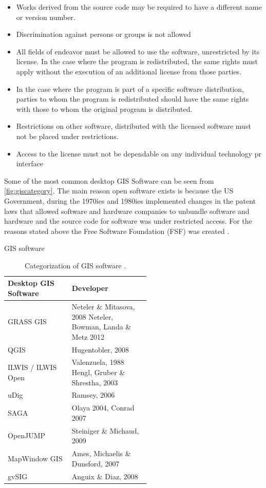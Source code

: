 \begin{itemize}
\item Works derived from the source code may be required to have a different name or version number.
\item Discrimination against persons or groups is not allowed
\item All fields of endeavor must be allowed to use the software, unrestricted by its license. In the case where the program is redistributed, the same rights must apply without the execution of an additional license from those parties.
\item In the case where the program is part of a specific software distribution, parties to whom the program is redistributed should have the same rights with those to  whom the original program is distributed.
\item Restrictions on other software, distributed with the licensed software must not be placed under restrictions.
\item Access to the license must not be dependable on any individual technology pr interface
\end{itemize}

Some of the most common desktop GIS Software can be seen from \autoref{fig:giscategory}.
The main reason open software exists is because the US Government, during the 1970ies and 1980ies implemented changes in the patent laws that allowed software and hardware companies to unbundle software and hardware and the source code for software was under restricted access. For the reasons stated above the Free Software Foundation (FSF) was created \citep{osbookde}.

\begin{table}[H]
\caption{GIS software}
\begin{tabular}{ l | p{0.55\linewidth} }
Desktop GIS Software & Developer \\ 
\hline
GRASS GIS & Neteler \& Mitasova, 2008 \newline
Neteler, Bowman, Landa \& Metz 2012 \\ 
\hline
QGIS & Hugentobler, 2008 \\ 
\hline
ILWIS / ILWIS Open & Valenzuela, 1988 \newline
Hengl, Gruber \& Shrestha, 2003 \\ 
\hline
uDig & Ramsey, 2006 \\ 
\hline
SAGA & Olaya 2004, Conrad 2007  \\ 
\hline
OpenJUMP & Steiniger \& Michaud, 2009 \\ 
\hline
MapWindow GIS & Ames, Michaelis \& Dunsford, 2007 \\ 
\hline
gvSIG & Anguix \& Diaz, 2008 \\ 
\hline
\end{tabular}
\caption*{Categorization of GIS software \citep{osarticle}.}
\label{tab:gissoftware}
\end{table}

